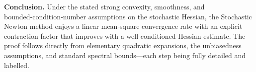 \documentclass{article}
\begin{document}
\bigskip
\noindent\textbf{Conclusion.} Under the stated strong convexity, smoothness, and bounded‑condition‑number assumptions on the stochastic Hessian, the Stochastic Newton method enjoys a linear mean‑square convergence rate with an explicit contraction factor that improves with a well‑conditioned Hessian estimate. The proof follows directly from elementary quadratic expansions, the unbiasedness assumptions, and standard spectral bounds—each step being fully detailed and labelled. 
\end{document}
